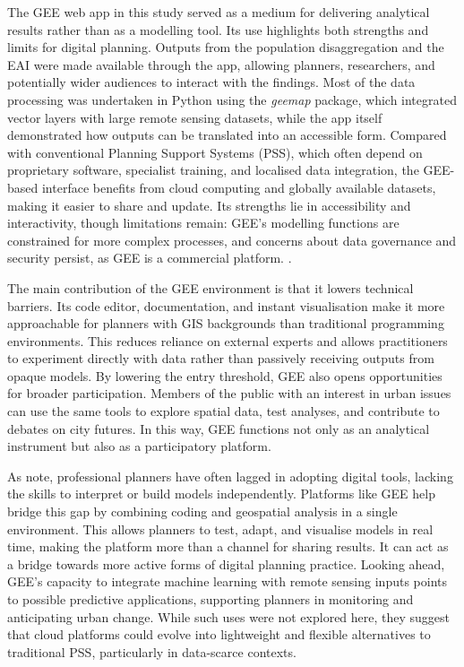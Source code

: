\documentclass[
  12pt,
  oneside]{book}
\begin{document}
The GEE web app in this study served as a medium for delivering analytical results rather than as a modelling tool. Its use highlights both strengths and limits for digital planning. Outputs from the population disaggregation and the EAI were made available through the app, allowing planners, researchers, and potentially wider audiences to interact with the findings. Most of the data processing was undertaken in Python using the \emph{geemap} package, which integrated vector layers with large remote sensing datasets, while the app itself demonstrated how outputs can be translated into an accessible form. Compared with conventional Planning Support Systems (PSS), which often depend on proprietary software, specialist training, and localised data integration, the GEE-based interface benefits from cloud computing and globally available datasets, making it easier to share and update. Its strengths lie in accessibility and interactivity, though limitations remain: GEE's modelling functions are constrained for more complex processes, and concerns about data governance and security persist, as GEE is a commercial platform. \autocite{zhaoProgressTrendsApplication2021}.

The main contribution of the GEE environment is that it lowers technical barriers. Its code editor, documentation, and instant visualisation make it more approachable for planners with GIS backgrounds than traditional programming environments. This reduces reliance on external experts and allows practitioners to experiment directly with data rather than passively receiving outputs from opaque models. By lowering the entry threshold, GEE also opens opportunities for broader participation. Members of the public with an interest in urban issues can use the same tools to explore spatial data, test analyses, and contribute to debates on city futures. In this way, GEE functions not only as an analytical instrument but also as a participatory platform.

As \textcite{danielDigitalDisruptionPlanning2021} note, professional planners have often lagged in adopting digital tools, lacking the skills to interpret or build models independently. Platforms like GEE help bridge this gap by combining coding and geospatial analysis in a single environment. This allows planners to test, adapt, and visualise models in real time, making the platform more than a channel for sharing results. It can act as a bridge towards more active forms of digital planning practice. Looking ahead, GEE's capacity to integrate machine learning with remote sensing inputs points to possible predictive applications, supporting planners in monitoring and anticipating urban change. While such uses were not explored here, they suggest that cloud platforms could evolve into lightweight and flexible alternatives to traditional PSS, particularly in data-scarce contexts.
\end{document}
